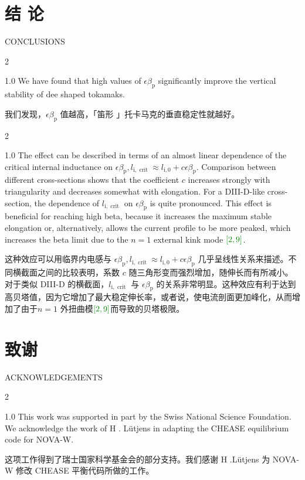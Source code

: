 \documentclass[utf8]{ctexart}
\newcommand\enzhbox[2]{
  	\quad\par \begin{paracol}{2} \colseprulecolor{black} 
  		\begin{spacing}{1.0}
  			\footnotesize  #1
  		\end{spacing}
  		\switchcolumn[1] 
  		#2
  	\end{paracol} \quad\par
  }
\begin{document}
\begin{sloppypar}
 \section{结 论}
 {  \small CONCLUSIONS \par }
 
\enzhbox{  We have found that high values of $\epsilon \beta_{\mathrm{p}}$ significantly improve the vertical stability of dee shaped tokamaks.}{
我们发现，$\epsilon \beta_{\mathrm{p}}$ 值越高，「笛形 」托卡马克的垂直稳定性就越好。}
  
 
\enzhbox{  The effect can be described in terms of an almost linear dependence of the critical internal inductance on $\epsilon \beta_{\mathrm{p}}, l_{\mathrm{i}, \text { crit }} \approx l_{\mathrm{i}, 0}+c \epsilon \beta_{\mathrm{p}}$. Comparison between different cross-sections shows that the coefficient $c$ increases strongly with triangularity and decreases somewhat with elongation. For a DIII-D-like cross-section, the dependence of $l_{\mathrm{i}, \text { crit }}$ on $\epsilon \beta_{\mathrm{p}}$ is quite pronounced. This effect is beneficial for reaching high beta, because it increases the maximum stable elongation or, alternatively, allows the current profile to be more peaked, which increases the beta limit due to the $n=1$ external kink mode $\textcolor{green!50!black}{[2,9]}$.}{
这种效应可以用临界内电感与 $\epsilon \beta_{\mathrm{p}}, l_{\mathrm{i}, \text { crit }} \approx l_{\mathrm{i}, 0}+c \epsilon \beta_{\mathrm{p}}$ 几乎呈线性关系来描述。不同横截面之间的比较表明，系数 $c$  随三角形变而强烈增加，随伸长而有所减小。对于类似 DIII-D 的横截面，$l_{\mathrm{i}, \text { crit }}$  与 $\epsilon \beta_{\mathrm{p}}$  的关系非常明显。这种效应有利于达到高贝塔值，因为它增加了最大稳定伸长率，或者说，使电流剖面更加峰化，从而增加了由于$n=1$ 外扭曲模$\textcolor{green!50!black}{[2,9]}$而导致的贝塔极限。}
  
 \section{致谢}
 {  \small ACKNOWLEDGEMENTS \par }
 
\enzhbox{  This work was supported in part by the Swiss National Science Foundation. We acknowledge the work of H . Lütjens in adapting the CHEASE equilibrium code for NOVA-W.}{
这项工作得到了瑞士国家科学基金会的部分支持。我们感谢 H .Lütjens 为 NOVA-W 修改 CHEASE 平衡代码所做的工作。}
  \setlength{\parskip}{0pt} \small %

\end{sloppypar}
\end{document}
